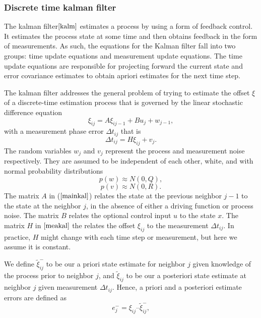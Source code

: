 \documentclass[a4paper,10pt]{report}
\begin{document}
\subsubsection{Discrete time kalman filter}
The kalman filter$\cite{kalm}$ estimates a process by using a form of feedback
control. It estimates the process state at some time and
then obtains feedback in the form of measurements. As such,
the equations for the Kalman filter fall into two groups: time
update equations and measurement update equations. The time update
equations are responsible for projecting forward the
current state and error covariance estimates to obtain apriori
estimates for the next time step.
\par
The kalman filter addresses the general problem of trying to
estimate the offset $\xi$ of a discrete-time estimation process that is
governed by the linear stochastic difference equation
\begin{equation}
 \xi_{ij} = A\xi_{ij-1} + Bu_j + w_{j-1} , \label{mainkal}
\end{equation}
with a measurement phase error $\Delta t_{ij}$ that is
\begin{equation}
 \Delta t_{ij} = H\xi_{ij} + v_j. \label{meakal}
\end{equation}
The random variables $w_j$ and $v_j$ represent the process and
measurement noise respectively. They are assumed to be
independent of each other, white, and with normal probability
distributions
\begin{equation}
 p(w) \approx N(0,Q),
\end{equation}
\begin{equation}
 p(v) \approx N(0,R).
\end{equation}
The matrix $A$ in ($\ref{mainkal}$) relates the state at
the previous neighbor $j-1$ to the state at the neighbor $j$,
in the absence of either a driving function or process noise. The matrix $B$ relates the optional
control input $u$ to the state $x$. The matrix $H$
in $\ref{meakal}$ the relates the offset $\xi_{ij}$ to the measurement $\Delta t_{ij}$. In
practice, $H$ might change with each time step or measurement, but
here we assume it is constant.
\par
We define $\tilde \xi_{ij}^-$ to be our a priori state estimate for
neighbor $j$ given knowledge of the process prior to neighbor $j$, and
$\tilde \xi_{ij}$ to be our a posteriori state estimate at neighbor $j$
given measurement $\Delta t_{ij}$. Hence, a priori and a posteriori estimate
errors are defined as
\begin{equation}
e_j^- = \xi_{ij} – \tilde \xi_{ij}^- ,
\end{equation}
\end{document}
